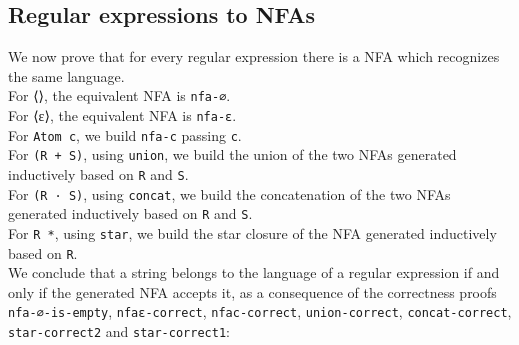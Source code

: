 \subsection{Regular expressions to NFAs}
We now prove that for every regular expression there is a NFA which recognizes the same language.\\
For ⟨⟩, the equivalent NFA is \texttt{nfa-∅}.\\
For ⟨ε⟩, the equivalent NFA is \texttt{nfa-ε}.\\
For \texttt{Atom c}, we build \texttt{nfa-c} passing \texttt{c}.\\
For \texttt{(R + S)}, using \texttt{union}, we build the union of the two NFAs generated inductively based on \texttt{R} and \texttt{S}.\\
For \texttt{(R · S)}, using \texttt{concat}, we build the concatenation of the two NFAs generated inductively based on \texttt{R} and \texttt{S}.\\
For \texttt{R *}, using \texttt{star}, we build the star closure of the NFA generated inductively based on \texttt{R}.\\
We conclude that a string belongs to the language of a regular expression if and only if the generated NFA accepts it, as a consequence of the correctness proofs \texttt{nfa-∅-is-empty}, \texttt{nfaε-correct}, \texttt{nfac-correct}, \texttt{union-correct}, \texttt{concat-correct},\\ \texttt{star-correct2} and \texttt{star-correct1}:
